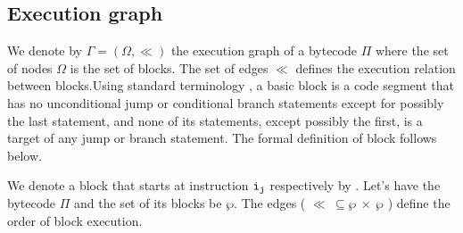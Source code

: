 
\subsection{Execution graph}\label{abstrCntrFlow}
We denote by $\Gamma  = ( \Omega, \ll)$ the execution graph of a
bytecode $\Pi$ where the set of nodes $\Omega$ is the set of
blocks. The set of edges $\ll$ defines the execution relation
between blocks.Using standard terminology \cite{ARUCom1986}, a
basic block is a code segment that has no unconditional jump or
conditional branch statements except for possibly the last
statement, and none of its statements, except possibly the first,
is a target of any jump or branch statement. The formal definition of block follows
below.

We denote a block that starts at instruction $\tt{i_{j}}$
respectively by . Let's have the bytecode $\Pi$ and the
set of its blocks  be $\wp$. The edges ( $\ll \ \subseteq \wp \ \times \ \wp $ ) define the order of block execution.

